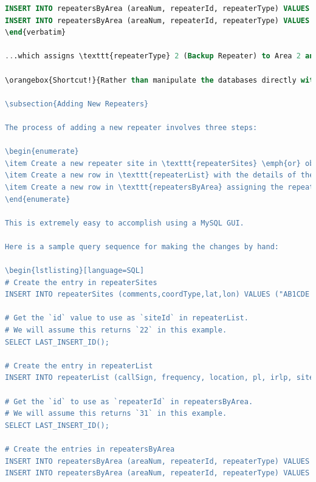 \documentclass[pdflatex,letterpaper,twoside,12pt]{book}
\begin{document}
\begin{lstlisting}[language=SQL]
INSERT INTO repeatersByArea (areaNum, repeaterId, repeaterType) VALUES (1, 6, 1);
INSERT INTO repeatersByArea (areaNum, repeaterId, repeaterType) VALUES (2, 6, 2);
\end{verbatim}

...which assigns \texttt{repeaterType} 2 (Backup Repeater) to Area 2 and \texttt{repeaterType} 1 (Primary Repeater) to Area 1.

\orangebox{Shortcut!}{Rather than manipulate the databases directly with raw MySQL queries as shown here, there are number of graphical user interfaces (GUI's) to make MySQL modifications much easier.  See our section called \nameref{database-server} starting on page \pageref{database-server} for information about accessing the MySQL server via both console and graphical interfaces.}

\subsection{Adding New Repeaters}

The process of adding a new repeater involves three steps:

\begin{enumerate}
\item Create a new repeater site in \texttt{repeaterSites} \emph{or} obtain the \texttt{id} of an existing site at the same location by querying \texttt{repeaterSites}.
\item Create a new row in \texttt{repeaterList} with the details of the repeater.
\item Create a new row in \texttt{repeatersByArea} assigning the repeater to an area and establishing its role.
\end{enumerate}

This is extremely easy to accomplish using a MySQL GUI.

Here is a sample query sequence for making the changes by hand:

\begin{lstlisting}[language=SQL]
# Create the entry in repeaterSites
INSERT INTO repeaterSites (comments,coordType,lat,lon) VALUES ("AB1CDE Repeater","exact",36.43567,-76.6789);

# Get the `id` value to use as `siteId` in repeaterList.
# We will assume this returns `22` in this example.
SELECT LAST_INSERT_ID();

# Create the entry in repeaterList
INSERT INTO repeaterList (callSign, frequency, location, pl, irlp, siteId) VALUES ("AB1CDE", 146.73, "MyTown, VA", 100, 4567, 22);

# Get the `id` to use as `repeaterId` in repeatersByArea.
# We will assume this returns `31` in this example.
SELECT LAST_INSERT_ID();

# Create the entries in repeatersByArea
INSERT INTO repeatersByArea (areaNum, repeaterId, repeaterType) VALUES (2, 31, 1);
INSERT INTO repeatersByArea (areaNum, repeaterId, repeaterType) VALUES (6, 31, 2);
\end{lstlisting}
\end{document}
